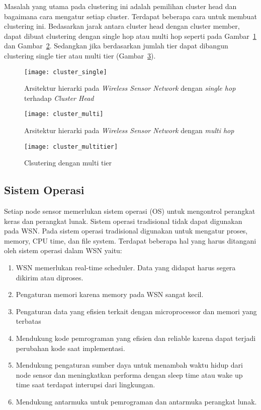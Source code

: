 Masalah yang utama pada clustering ini adalah pemilihan cluster head dan bagaimana cara mengatur setiap cluster. Terdapat beberapa cara untuk membuat clustering ini. Bedasarkan jarak antara cluster head dengan cluster member, dapat dibuat clustering dengan single hop atau multi hop seperti pada Gambar~\ref{fig:cluster_single} dan Gambar~\ref{fig:cluster_multi}. Sedangkan jika berdasarkan jumlah tier dapat dibangun clustering single tier atau multi tier (Gambar~\ref{fig:cluster_multitier}).
\begin{figure} [H]
	\centering  
	\texttt{[image: cluster\_single]}  
	\caption[Arsitektur hierarki pada \textit{Wireless Sensor Network} dengan \textit{single hop} terhadap \textit{Cluster Head}]{Arsitektur hierarki pada \textit{Wireless Sensor Network} dengan \textit{single hop} terhadap \textit{Cluster Head}} 
	\label{fig:cluster_single} 
\end{figure} 
\begin{figure} [H]
	\centering  
	\texttt{[image: cluster\_multi]}  
	\caption[Arsitektur hierarki pada \textit{Wireless Sensor Network} dengan \textit{multi hop}]{Arsitektur hierarki pada \textit{Wireless Sensor Network} dengan \textit{multi hop}} 
	\label{fig:cluster_multi} 
\end{figure} 
\begin{figure} [H]
	\centering  
	\texttt{[image: cluster\_multitier]}  
	\caption[Clsutering dengan multi tier]{Clsutering dengan multi tier} 
	\label{fig:cluster_multitier} 
\end{figure}

\subsection{Sistem Operasi}
Setiap node sensor memerlukan sistem operasi (OS) untuk mengontrol perangkat keras dan perangkat lunak. Sistem operasi tradisional tidak dapat digunakan pada WSN. Pada sistem operasi tradisional digunakan untuk mengatur proses, memory, CPU time, dan file system. Terdapat beberapa hal yang harus ditangani oleh sistem operasi dalam WSN yaitu:
\begin{enumerate}
	\item WSN memerlukan real-time scheduler. Data yang didapat harus segera dikirim atau diproses.
	\item Pengaturan memori karena memory pada WSN sangat kecil.
	\item Pengaturan data yang efisien terkait dengan microprocessor dan memori yang terbatas
	\item Mendukung kode pemrograman yang efisien dan reliable karena dapat terjadi perubahan kode saat implementasi.
	\item Mendukung pengaturan sumber daya untuk menambah waktu hidup dari node sensor dan meningkatkan performa dengan sleep time atau wake up time saat terdapat interupsi dari lingkungan.
	\item Mendukung antarmuka untuk pemrograman dan antarmuka perangkat lunak. 
\end{enumerate}

